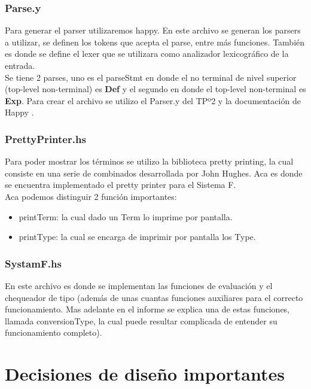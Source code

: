 \documentclass[12pt, titlepage, a4paper]{article}
\begin{document}
\subsubsection{Parse.y}
Para generar el parser utilizaremos happy. En este archivo se generan los parsers a utilizar, se definen los tokens que acepta el parse, 
entre más funciones. También es donde se define el lexer que se utilizara como analizador lexicográfico de la entrada. \\ 

Se tiene 2 parses, uno es el parseStmt en donde el no terminal de nivel superior (top-level non-terminal) es \textbf{Def} y el 
segundo en donde el top-level non-terminal es \textbf{Exp}. 
Para crear el archivo se utilizo el Parser.y del TPº2 \cite{tp2:lambdaCalculoSimpleTipado} y la documentación de Happy \cite{haskellHappy}. \\

\subsubsection{PrettyPrinter.hs}
Para poder mostrar los términos se utilizo la biblioteca pretty printing, la cual consiste en una serie de combinados desarrollada por John Hughes. Aca es 
donde se encuentra implementado el pretty printer para el Sistema F. \\
Aca podemos distinguir 2 función importantes:
\begin{itemize}[label=$\bullet$]
  \item {printTerm: la cual dado un Term lo imprime por pantalla.}
  \item {printType: la cual se encarga de imprimir por pantalla los Type.}
\end{itemize}

\subsubsection{SystamF.hs}
En este archivo es donde se implementan las funciones de evaluación y el chequeador de tipo (además de unas cuantas funciones auxiliares 
para el correcto funcionamiento. Mas adelante en el informe se explica una de estas funciones, llamada conversionType, la cual puede resultar complicada de entender su 
funcionamiento completo).

\section{Decisiones de diseño importantes}
\end{document}
